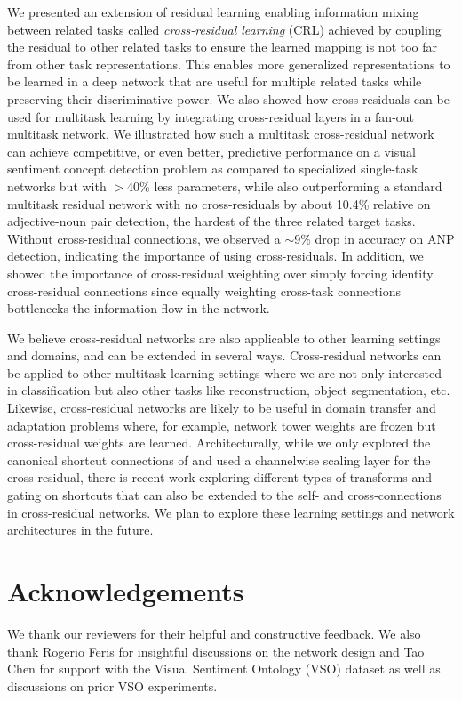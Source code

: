\documentclass{sig-alternate-05-2015}
\begin{document}
We presented an extension of residual learning enabling information mixing between related tasks called \emph{cross-residual learning} (CRL) achieved by coupling the residual to other related tasks to ensure the learned mapping is not too far from other task representations.
This enables more generalized representations to be learned in a deep network that are useful for multiple related tasks while preserving their discriminative power.
We also showed how cross-residuals can be used for multitask learning by integrating cross-residual layers in a fan-out multitask network.
We illustrated how such a multitask cross-residual network can achieve competitive, or even better, predictive performance on a visual sentiment concept detection problem as compared to specialized single-task networks but with $>$40\% less parameters, while also outperforming a standard multitask residual network with no cross-residuals by about 10.4\% relative on adjective-noun pair detection, the hardest of the three related target tasks.
Without cross-residual connections, we observed a $\sim$9\% drop in accuracy on ANP detection, indicating the importance of using cross-residuals.
In addition, we showed the importance of cross-residual weighting over simply forcing identity cross-residual connections since equally weighting cross-task connections bottlenecks the information flow in the network.

We believe cross-residual networks are also applicable to other learning settings and domains, and can be extended in several ways.
Cross-residual networks can be applied to other multitask learning settings where we are not only interested in classification but also other tasks like reconstruction, object segmentation, etc.
Likewise, cross-residual networks are likely to be useful in domain transfer and adaptation problems where, for example, network tower weights are frozen but cross-residual weights are learned.
Architecturally, while we only explored the canonical shortcut connections of \cite{he_2016} and used a channelwise scaling layer for the cross-residual, there is recent work exploring different types of transforms and gating on shortcuts \cite{he_2016_imap} that can also be extended to the self- and cross-connections in cross-residual networks.
We plan to explore these learning settings and network architectures in the future.

\section*{Acknowledgements}
We thank our reviewers for their helpful and constructive feedback.
We also thank Rogerio Feris for insightful discussions on the network design and Tao Chen for support with the Visual Sentiment Ontology (VSO) dataset as well as discussions on prior VSO experiments.
\end{document}
